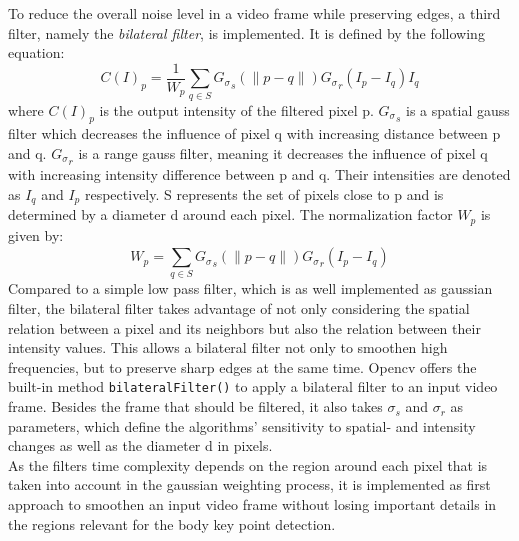 \noindent To reduce the overall noise level in a video frame while preserving
edges, a third filter, namely the \textit{bilateral filter}, is implemented.
It is defined by the following equation:
\begin{equation}
    C(I)_p = \frac{1}{W_p}\sum_{q \in S}^{} {G_\sigma}_s(\lVert p - q \rVert) {G_\sigma}_r(I_p - I_q)I_q
\end{equation}
where $C(I)_p$ is the output intensity of the filtered pixel p. ${G_\sigma}_s$
is a spatial gauss filter which decreases the influence of pixel q with
increasing distance between p and q.
${G_\sigma}_r$ is a range gauss filter, meaning it decreases the influence of
pixel q with increasing intensity difference between p and q.
Their intensities are denoted as $I_q$ and $I_p$ respectively.
S represents the set of pixels close to p and is determined by a diameter d
around each pixel.
The normalization factor $W_p$ is given by:
\begin{equation}
    W_p = \sum_{q \in S}^{} {G_\sigma}_s(\lVert p - q \rVert) {G_\sigma}_r(I_p - I_q)
\end{equation}
Compared to a simple low pass filter, which is as well implemented as gaussian
filter, the bilateral filter takes advantage of not only considering the
spatial relation between a pixel and its neighbors but also the relation
between their intensity values.
This allows a bilateral filter not only to smoothen high frequencies, but to
preserve sharp edges at the same time.
Opencv offers the built-in method \texttt{bilateralFilter()} to apply a
bilateral filter to an input video frame.
Besides the frame that should be filtered, it also takes $\sigma_s$ and
$\sigma_r$ as parameters, which define the algorithms' sensitivity to
spatial- and intensity changes as well as the diameter d in pixels.\\
As the filters time complexity depends on the region around each pixel that
is taken into account in the gaussian weighting process, it is implemented as
first approach to smoothen an input video frame without losing important
details in the regions relevant for the body key point detection.

